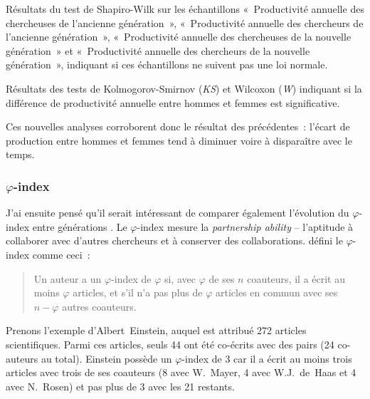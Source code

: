 			\begin{table}[ht]
				\centering
				\caption{Résultats du test de Shapiro-Wilk sur les échantillons «~Productivité annuelle des chercheuses de l'ancienne génération~», «~Productivité annuelle des chercheurs de l'ancienne génération~», «~Productivité annuelle des chercheuses de la nouvelle génération~» et «~Productivité annuelle des chercheurs de la nouvelle génération~», indiquant si ces échantillons ne suivent pas une loi normale.}\label{tab:testsNormBis}
				
			\end{table}
			
			\begin{table}[hb]
				\centering
				\caption{Résultats des tests de Kolmogorov-Smirnov (\textit{KS}) et Wilcoxon (\textit{W}) indiquant si la différence de productivité annuelle entre hommes et femmes est significative.}\label{tab:tCompProdBis}
				
			\end{table}
			
			Ces nouvelles analyses corroborent donc le résultat des précédentes~: l'écart de production entre hommes et femmes tend à diminuer voire à disparaître avec le temps.
		
		
		\subsubsection{$\varphi$-index}
			J'ai ensuite pensé qu'il serait intéressant de comparer également l'évolution du $\varphi$-index entre générations \citep{hirsch}. Le $\varphi$-index mesure la \textit{partnership ability} -- l'aptitude à collaborer avec d'autres chercheurs et à conserver des collaborations. \cite{hirsch} défini le $\varphi$-index comme ceci~:
			
			\begin{quote}
			Un auteur a un $\varphi$-index de $\varphi$ si, avec $\varphi$ de ses $n$ coauteurs, il a écrit au moins $\varphi$ articles, et s'il n'a pas plus de $\varphi$ articles en commun avec ses $n-\varphi$ autres coauteurs.
			\end{quote}
			
			Prenons l'exemple d'Albert~Einstein, auquel est attribué 272 articles scientifiques. Parmi ces articles, seuls 44 ont été co-écrits avec des pairs (24 co-auteurs au total). Einstein possède un $\varphi$-index de 3 car il a écrit au moins trois articles avec trois de ses coauteurs (8 avec W.~Mayer, 4 avec W.J.~de~Haas et 4 avec N.~Rosen) et pas plus de 3 avec les 21 restants.
			
